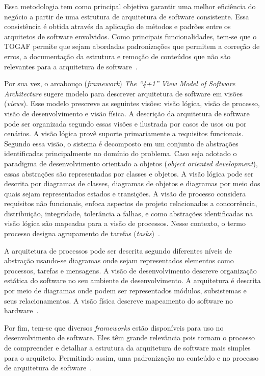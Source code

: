 Essa metodologia tem como principal objetivo garantir uma melhor eficiência do negócio a partir de uma estrutura de arquitetura de software consistente. Essa consistência é obtida através da aplicação de métodos e padrões entre os arquitetos de software envolvidos. Como principais funcionalidades, tem-se que o \acrfull{TOGAF} permite que sejam abordadas padronizações que permitem a correção de erros, a documentação da estrutura e remoção de conteúdos que não são relevantes para a arquitetura de software~\cite{Togaf}.

Por sua vez, o arcabouço (\emph{framework}) \emph{The “4+1” View Model of Software Architecture} sugere modelo para descrever arquitetura de software em visões (\emph{views}). Esse modelo prescreve as seguintes visões: visão lógica, visão de processo, visão de desenvolvimento e visão física. A descrição da arquitetura de software pode ser organizada segundo essas visões e ilustrada por casos de usos ou por cenários. A visão lógica provê suporte primariamente a requisitos funcionais. Segundo essa visão, o sistema é decomposto em um conjunto de abstrações identificadas principalmente no domínio do problema. Caso seja adotado o paradigma de desenvolvimento orientado a objetos (\emph{object oriented development}), essas abstrações são representadas por classes e objetos. A visão lógica pode ser descrita por diagramas de classes, diagramas de objetos e diagramas por meio dos quais sejam representados estados e transições. A visão de processo considera requisitos não funcionais, enfoca aspectos de projeto relacionados a concorrência, distribuição, integridade, tolerância a falhas, e como abstrações identificadas na visão lógica são mapeadas para a visão de processos. Nesse contexto, o termo processo designa agrupamento de tarefas (\emph{tasks})~\cite{4plus1}. 

A arquitetura de processos pode ser descrita segundo diferentes níveis de abstração usando-se diagramas onde sejam representados elementos como processos, tarefas e mensagens. A visão de desenvolvimento descreve organização estática do software no seu ambiente de desenvolvimento. A arquitetura é descrita por meio de diagramas onde podem ser representados módulos, subsistemas e seus relacionamentos. A visão física descreve mapeamento do software no hardware~\cite{4plus1}.

Por fim, tem-se que diversos \emph{frameworks} estão disponíveis para uso no desenvolvimento de software. Eles têm grande relevância pois tornam o processo de compreender e detalhar a estrutura da arquitetura de software mais simples para o arquiteto. Permitindo assim, uma padronização no conteúdo e no processo de arquitetura de software~\cite{ISO_42010}.
